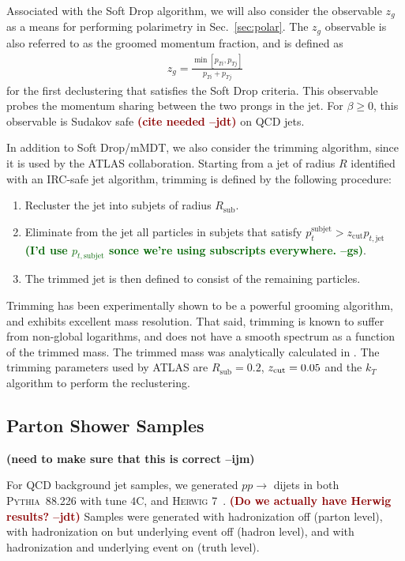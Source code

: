 \documentclass[11pt,letterpaper]{article}
\newcommand{\pythia}{\textsc{Pythia~8}\xspace}
\DeclareRobustCommand{\Sec}[1]{Sec.~\ref{#1}}
\newcommand{\zcut}{z_{\rm cut}}
\newcommand{\jdt}[1]{\textbf{\textcolor{darkred}{(#1 --jdt)}}}
\newcommand{\ijm}[1]{\textbf{\textcolor{llblue}{(#1 --ijm)}}}
\newcommand{\gs}[1]{\textbf{\textcolor{darkgreen}{(#1 --gs)}}}
\begin{document}
Associated with the Soft Drop algorithm, we will also consider the observable $z_g$ as a means for performing polarimetry in \Sec{sec:polar}.
%
The $z_g$ observable is also referred to as the groomed momentum fraction, and is defined as
%
\begin{align}
z_g=\frac{\min\left[ p_{Ti}, p_{Tj}  \right]}{p_{Ti}+p_{Tj}}
\end{align}
%
for the first declustering that satisfies the Soft Drop criteria.
%
This observable probes the momentum sharing between the two prongs in the
jet. For $\beta \ge 0$, this observable is Sudakov safe \jdt{cite needed} on QCD
jets.

In addition to Soft Drop/mMDT, we also consider the trimming algorithm, since it is used by the ATLAS collaboration.
%
Starting from a jet of radius $R$ identified with an IRC-safe jet algorithm, trimming is defined by the following procedure:
%
\begin{enumerate}
%
\item Recluster the jet into subjets of radius $R_{\text{sub}}$.
%
\item Eliminate from the jet all particles in subjets that satisfy
  $p_t^{\text{subjet}} > z_{\text{cut}}p_{t,\text{jet}}$ \gs{I'd use
    $p_{t,\text{subjet}}$ sonce we're using subscripts everywhere.}.
%
\item The trimmed jet is then defined to consist of the remaining particles.
%
\end{enumerate}
%
Trimming has been experimentally shown to be a powerful grooming algorithm, and exhibits excellent mass resolution.
%
That said, trimming is known to suffer from non-global logarithms, and does not have a smooth spectrum as a function of the trimmed mass.
%
The trimmed mass was analytically calculated in \cite{Dasgupta:2013ihk}.
%
The trimming parameters used by ATLAS are $R_{\text{sub}}=0.2$,  $ \zcut=0.05$ and the $k_T$ algorithm to perform the reclustering.


\subsection{Parton Shower Samples}\label{sec:samples_sub}

\ijm{need to make sure that this is correct}

For QCD background jet samples, we generated $pp\to$ dijets in both \pythia{8.226} \cite{Sjostrand:2006za,Sjostrand:2007gs} with tune $4$C, and \textsc{Herwig} 7~\cite{Bahr:2008pv,Bellm:2015jjp}.  \jdt{Do we actually have Herwig results?}
%
Samples were generated with hadronization off (parton level), with hadronization on but underlying event off (hadron level), and with hadronization and underlying event on (truth level).
\end{document}
